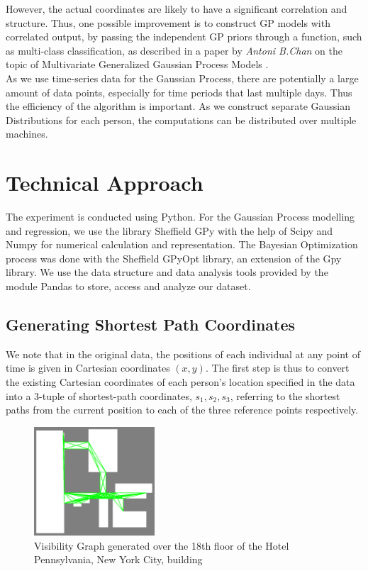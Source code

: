 \documentclass[letterpaper]{article}
\begin{document}
However, the actual coordinates are likely to have a significant correlation and structure. Thus, one possible improvement is to construct GP models with correlated output, by passing the independent GP priors through a function, such as multi-class classification, as described in a paper by {\it Antoni B.Chan} on the topic of Multivariate Generalized Gaussian Process Models \cite{achan}. \\

As we use time-series data for the Gaussian Process, there are potentially a large amount of data points, especially for time periods that last multiple days. Thus the efficiency of the algorithm is important. As we construct separate Gaussian Distributions for each person, the computations can be distributed over multiple machines.


\section{Technical Approach}
The experiment is conducted using Python. For the Gaussian Process modelling and regression, we use the library Sheffield GPy with the help of Scipy and Numpy for numerical calculation and representation. The Bayesian Optimization process was done with the Sheffield GPyOpt library, an extension of the Gpy library. We use the data structure and data analysis tools provided by the module Pandas to store, access and analyze our dataset.

\subsection{Generating Shortest Path Coordinates}

We note that in the original data, the positions of each individual at any point of time is given in Cartesian coordinates $(x,y)$. The first step is thus to convert the existing Cartesian coordinates of each person's location specified in the data into a 3-tuple of shortest-path coordinates, $s_1, s_2, s_3$, referring to the shortest paths from the current position to each of the three reference points respectively.\\

\begin{figure}[!h]
  \centering
    \includegraphics[width=170px]{diagrams/floor18visibilitygraph.png}
  \caption{Visibility Graph generated over the 18th floor of the Hotel Pennsylvania, New York City, building}
  \label{fig:floor18vg}
\end{figure}
\end{document}
